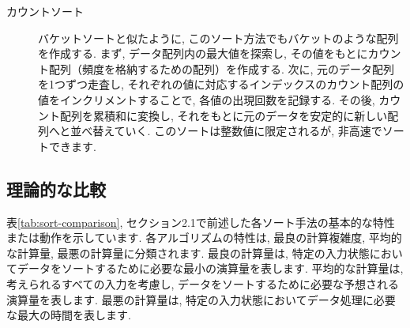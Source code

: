 \documentclass[a4j, 12pt]{jarticle}
\begin{document}
\begin{description}
  \item[カウントソート] バケットソートと似たように, このソート方法でもバケットのような配列を作成する. まず, データ配列内の最大値を探索し, その値をもとにカウント配列（頻度を格納するための配列）を作成する. 次に, 元のデータ配列を1つずつ走査し, それぞれの値に対応するインデックスのカウント配列の値をインクリメントすることで, 各値の出現回数を記録する. その後, カウント配列を累積和に変換し, それをもとに元のデータを安定的に新しい配列へと並べ替えていく. このソートは整数値に限定されるが, 非高速でソートできます. \\
\end{description}

\subsection{理論的な比較}
表\ref{tab:sort-comparison}, セクション2.1で前述した各ソート手法の基本的な特性または動作を示しています. 各アルゴリズムの特性は, 最良の計算複雑度, 平均的な計算量, 最悪の計算量に分類されます. 最良の計算量は, 特定の入力状態においてデータをソートするために必要な最小の演算量を表します. 平均的な計算量は, 考えられるすべての入力を考慮し, データをソートするために必要な予想される演算量を表します. 最悪の計算量は, 特定の入力状態においてデータ処理に必要な最大の時間を表します.
\begin{table}[htbp]
  \centering
  \caption{各ソートアルゴリズムの計算量と特徴の比較}\label{tab:sort-comparison}
\end{table}
\end{document}
